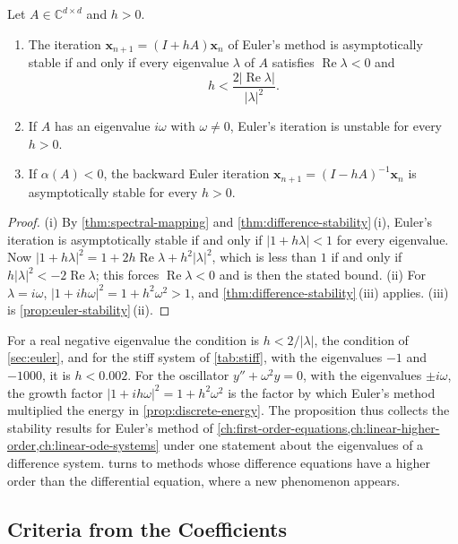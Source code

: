 \begin{proposition}
\label{prop:euler-step-condition}
Let $A\in\mathbb C^{d\times d}$ and $h>0$.
\begin{enumerate}
\item The iteration $\mathbf x_{n+1}=(I+hA)\mathbf x_n$ of Euler's method is asymptotically stable if and only if every eigenvalue $\lambda$ of $A$ satisfies $\operatorname{Re}\lambda<0$ and
\[
h<\frac{2|\operatorname{Re}\lambda|}{|\lambda|^2} .
\]
\item If $A$ has an eigenvalue $i\omega$ with $\omega\ne0$, Euler's iteration is unstable for every $h>0$.
\item If $\alpha(A)<0$, the backward Euler iteration $\mathbf x_{n+1}=(I-hA)^{-1}\mathbf x_n$ is asymptotically stable for every $h>0$.
\end{enumerate}
\end{proposition}

\begin{proof}
(i) By \cref{thm:spectral-mapping} and \cref{thm:difference-stability}\,(i), Euler's iteration is asymptotically stable if and only if $|1+h\lambda|<1$ for every eigenvalue. Now $|1+h\lambda|^2=1+2h\operatorname{Re}\lambda+h^2|\lambda|^2$, which is less than $1$ if and only if $h|\lambda|^2<-2\operatorname{Re}\lambda$; this forces $\operatorname{Re}\lambda<0$ and is then the stated bound. (ii) For $\lambda=i\omega$, $|1+ih\omega|^2=1+h^2\omega^2>1$, and \cref{thm:difference-stability}\,(iii) applies. (iii) is \cref{prop:euler-stability}\,(ii).
\end{proof}

For a real negative eigenvalue the condition is $h<2/|\lambda|$, the condition of \cref{sec:euler}, and for the stiff system of \cref{tab:stiff}, with the eigenvalues $-1$ and $-1000$, it is $h<0.002$. For the oscillator $y''+\omega^2y=0$, with the eigenvalues $\pm i\omega$, the growth factor $|1+ih\omega|^2=1+h^2\omega^2$ is the factor by which Euler's method multiplied the energy in \cref{prop:discrete-energy}. The proposition thus collects the stability results for Euler's method of \cref{ch:first-order-equations,ch:linear-higher-order,ch:linear-ode-systems} under one statement about the eigenvalues of a difference system.  turns to methods whose difference equations have a higher order than the differential equation, where a new phenomenon appears.

\subsection{Criteria from the Coefficients}

